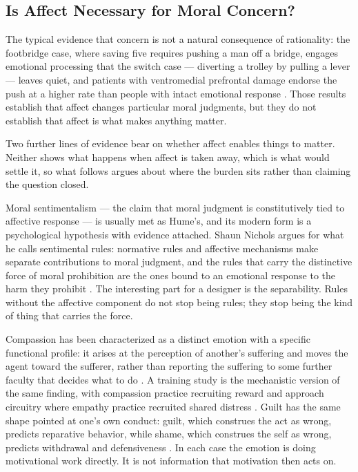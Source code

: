 \subsection{Is Affect Necessary for Moral Concern?}
\label{sec:2.2.3}
The typical evidence that concern is not a natural consequence of rationality: the footbridge case, where saving five requires pushing a man off a bridge, engages emotional processing that the switch case — diverting a trolley by pulling a lever — leaves quiet, and patients with ventromedial prefrontal damage endorse the push at a higher rate than people with intact emotional response \autocite{greene2001fmri,koenigs2007damage}. Those results establish that affect changes particular moral judgments, but they do not establish that affect is what makes anything matter.

Two further lines of evidence bear on whether affect enables things to matter. Neither shows what happens when affect is taken away, which is what would settle it, so what follows argues about where the burden sits rather than claiming the question closed.

Moral sentimentalism — the claim that moral judgment is constitutively tied to affective response — is usually met as Hume's, and its modern form is a psychological hypothesis with evidence attached. Shaun Nichols argues for what he calls sentimental rules: normative rules and affective mechanisms make separate contributions to moral judgment, and the rules that carry the distinctive force of moral prohibition are the ones bound to an emotional response to the harm they prohibit \autocite{nichols2004sentimental}. The interesting part for a designer is the separability. Rules without the affective component do not stop being rules; they stop being the kind of thing that carries the force.

Compassion has been characterized as a distinct emotion with a specific functional profile: it arises at the perception of another's suffering and moves the agent toward the sufferer, rather than reporting the suffering to some further faculty that decides what to do \autocite{goetz2010compassion}. A training study is the mechanistic version of the same finding, with compassion practice recruiting reward and approach circuitry where empathy practice recruited shared distress \autocite{klimecki2013differential}. Guilt has the same shape pointed at one's own conduct: guilt, which construes the act as wrong, predicts reparative behavior, while shame, which construes the self as wrong, predicts withdrawal and defensiveness \autocite{tangney2007moral}. In each case the emotion is doing motivational work directly. It is not information that motivation then acts on.

